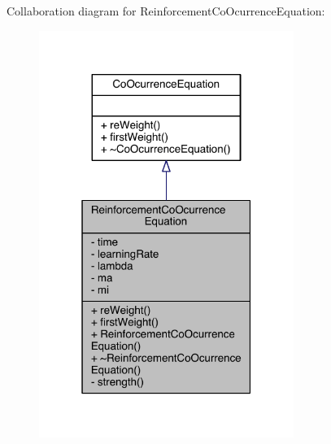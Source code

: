 Collaboration diagram for Reinforcement\+Co\+Ocurrence\+Equation\+:\nopagebreak
\begin{figure}[H]
\begin{center}
\leavevmode
\includegraphics[width=235pt]{class_reinforcement_co_ocurrence_equation__coll__graph}
\end{center}
\end{figure}


